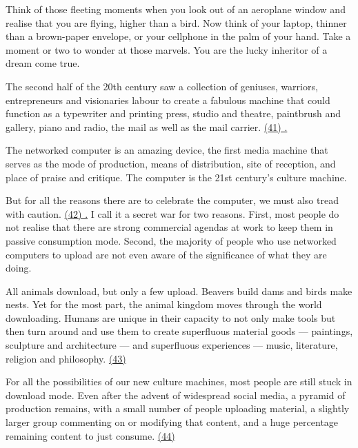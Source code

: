 
\qquad Think of those fleeting moments when you look out of an aeroplane window and realise that you are flying, higher than a bird. Now think of your laptop, thinner than a brown-paper envelope, or your cellphone in the palm of your hand. Take a moment or two to wonder at those marvels. You are the lucky inheritor of a dream come true.

\qquad The second half of the 20th century saw a collection of geniuses, warriors, entrepreneurs and visionaries labour to create a fabulous machine that could function as a typewriter and printing press, studio and theatre, paintbrush and gallery, piano and radio, the mail as well as the mail carrier. \ul{(41) \quad\quad\quad\quad\quad\quad\quad\quad.}

\qquad The networked computer is an amazing device, the first media machine that serves as the mode of production, means of distribution, site of reception, and place of praise and critique. The computer is the 21st century's culture machine.

\qquad But for all the reasons there are to celebrate the computer, we must also tread with caution. \ul{(42) \quad.} I call it a secret war for two reasons. First, most people do not realise that there are strong commercial agendas at work to keep them in passive consumption mode. Second, the majority of people who use networked computers to upload are not even aware of the significance of what they are doing.

\qquad All animals download, but only a few upload. Beavers build dams and birds make nests. Yet for the most part, the animal kingdom moves through the world downloading. Humans are unique in their capacity to not only make tools but then turn around and use them to create superfluous material goods --- paintings, sculpture and architecture --- and superfluous experiences --- music, literature, religion and philosophy. \ul{(43) \quad\quad\quad\quad\quad\quad\quad\quad\quad\quad\quad\quad}

\qquad For all the possibilities of our new culture machines, most people are still stuck in download mode. Even after the advent of widespread social media, a pyramid of production remains, with a small number of people uploading material, a slightly larger group commenting on or modifying that content, and a huge percentage remaining content to just consume. \ul{(44) \quad\quad\quad\quad\quad\quad\quad\quad\quad\quad\quad\quad}

